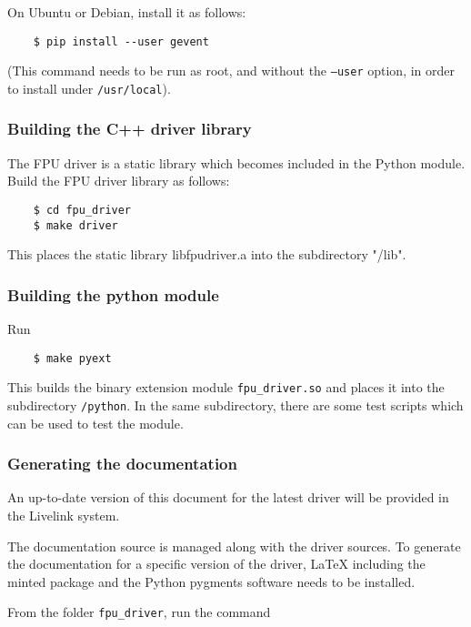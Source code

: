 \documentclass{scrartcl}[12pt,a4paper]
\begin{document}
On Ubuntu or Debian, install it as follows:

  \begin{verbatim}
    $ pip install --user gevent
  \end{verbatim}    

(This command needs to be run as root, and without the \texttt{--user}
  option, in order to install under \texttt{/usr/local}).



\subsubsection{Building the C++ driver library}

The FPU driver is a static library which becomes included in the
Python module.  Build the FPU driver library as follows:

  \begin{verbatim}
    $ cd fpu_driver
    $ make driver
  \end{verbatim}    

This places the static library libfpudriver.a into
the subdirectory "/lib".

\subsubsection{Building the python module}

Run

  \begin{verbatim}
    $ make pyext
  \end{verbatim}    

This builds the binary extension module \verb+fpu_driver.so+
and places it into the subdirectory \verb+/python+.
In the same subdirectory, there are some test
scripts which can be used to test the module.

\subsubsection{Generating the documentation}

An up-to-date version of this document for the
latest driver will be provided in the Livelink
system.

The documentation source is managed along with the driver sources.  To
generate the documentation for a specific version of the driver,
\LaTeX{} including the minted package and the
Python pygments software needs to be installed.

From the folder \texttt{fpu\_driver}, run the
command
\end{document}
